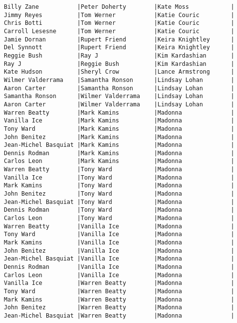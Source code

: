 \documentclass{article}
\begin{document}
\begin{verbatim}
Billy Zane           |Peter Doherty        |Kate Moss            |
Jimmy Reyes          |Tom Werner           |Katie Couric         |
Chris Botti          |Tom Werner           |Katie Couric         |
Carroll Lesesne      |Tom Werner           |Katie Couric         |
Jamie Dornan         |Rupert Friend        |Keira Knightley      |
Del Synnott          |Rupert Friend        |Keira Knightley      |
Reggie Bush          |Ray J                |Kim Kardashian       |
Ray J                |Reggie Bush          |Kim Kardashian       |
Kate Hudson          |Sheryl Crow          |Lance Armstrong      |
Wilmer Valderrama    |Samantha Ronson      |Lindsay Lohan        |
Aaron Carter         |Samantha Ronson      |Lindsay Lohan        |
Samantha Ronson      |Wilmer Valderrama    |Lindsay Lohan        |
Aaron Carter         |Wilmer Valderrama    |Lindsay Lohan        |
Warren Beatty        |Mark Kamins          |Madonna              |
Vanilla Ice          |Mark Kamins          |Madonna              |
Tony Ward            |Mark Kamins          |Madonna              |
John Benitez         |Mark Kamins          |Madonna              |
Jean-Michel Basquiat |Mark Kamins          |Madonna              |
Dennis Rodman        |Mark Kamins          |Madonna              |
Carlos Leon          |Mark Kamins          |Madonna              |
Warren Beatty        |Tony Ward            |Madonna              |
Vanilla Ice          |Tony Ward            |Madonna              |
Mark Kamins          |Tony Ward            |Madonna              |
John Benitez         |Tony Ward            |Madonna              |
Jean-Michel Basquiat |Tony Ward            |Madonna              |
Dennis Rodman        |Tony Ward            |Madonna              |
Carlos Leon          |Tony Ward            |Madonna              |
Warren Beatty        |Vanilla Ice          |Madonna              |
Tony Ward            |Vanilla Ice          |Madonna              |
Mark Kamins          |Vanilla Ice          |Madonna              |
John Benitez         |Vanilla Ice          |Madonna              |
Jean-Michel Basquiat |Vanilla Ice          |Madonna              |
Dennis Rodman        |Vanilla Ice          |Madonna              |
Carlos Leon          |Vanilla Ice          |Madonna              |
Vanilla Ice          |Warren Beatty        |Madonna              |
Tony Ward            |Warren Beatty        |Madonna              |
Mark Kamins          |Warren Beatty        |Madonna              |
John Benitez         |Warren Beatty        |Madonna              |
Jean-Michel Basquiat |Warren Beatty        |Madonna              |

\end{verbatim}
\end{document}
